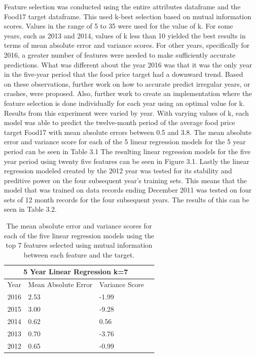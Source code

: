 \documentclass[12pt]{dalthesis}
\begin{document}
Feature selection was conducted using the entire attributes dataframe and the Food17 target dataframe. This used k-best selection based on mutual information scores. Values in the range of 5 to 35 were used for the value of k. For some years, such as 2013 and 2014, values of k less than 10 yielded the best results in terms of mean absolute error and variance scores. For other years, specifically for 2016, a greater number of features were needed to make sufficiently accurate predictions. What was different about the year 2016 was that it was the only year in the five-year period that the food price target had a downward trend. Based on these observations, further work on how to accurate predict irregular years, or crashes, were proposed. Also, further work to create an implementation where the feature selection is done individually for each year using an optimal value for k. \\

Results from this experiment were varied by year. With varying values of k, each model was able to predict the twelve-month period of the average food price target Food17 with mean absolute errors between 0.5 and 3.8. The mean absolute error and variance score for each of the 5 linear regression models for the 5 year period can be seen in Table 3.1 The resulting linear regression models for the five year period using twenty five features can be seen in Figure 3.1. Lastly the linear regression modeled created by the 2012 year was tested for its stability and preditive power on the four subsequent year's training sets. This means that the model that was trained on data records ending December 2011 was tested on four sets of 12 month records for the four subsequent years. The results of this can be seen in Table 3.2. \\


\begin{table}
	\caption{The mean absolute error and variance scores for each of the five linear regression models using the top 7 features selected using mutual information between each feature and the target. }
	\label{tab:5yearerrors}
    \begin{tabular}{ |p{4cm}||p{4cm}|p{4cm}|p{4cm}|  }
       \hline
       \multicolumn{3}{|c|}{5 Year Linear Regression k=7} \\
       \hline
       Year    & Mean Absolute Error    & Variance Score \\
       \hline
       2016    & 2.53    & -1.99\\
       2015    & 3.00    & -9.28\\
       2014    & 0.62    & 0.56\\
       2013    & 0.70    & -3.76\\
       2012    & 0.65    & -0.99\\
       \hline
    \end{tabular}
\end{table}
\end{document}
